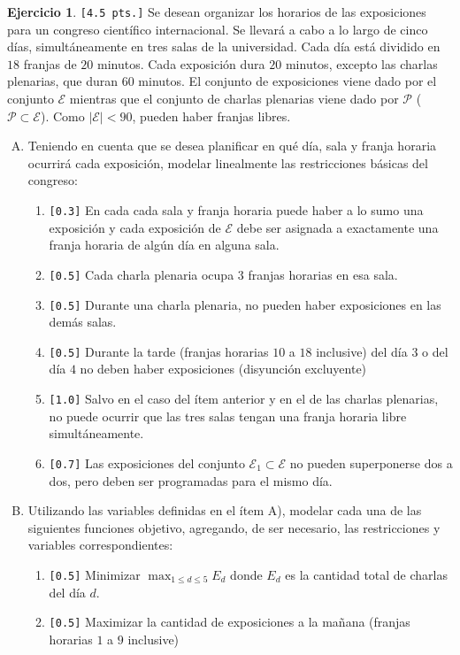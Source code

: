 \documentclass[a4paper,oneside,12pt]{amsart}
\def \ds{\displaystyle}
\theoremstyle{definition}
\newtheorem{quest}{Ejercicio}
\begin{document}


\begin{quest} 

\verb|[4.5 pts.]| Se desean organizar los horarios de las exposiciones para un congreso científico internacional. Se llevará a cabo a lo largo de cinco días, simultáneamente en tres salas de la universidad. Cada día está dividido en $18$ franjas de $20$ minutos. Cada exposición dura $20$ minutos, excepto las charlas plenarias, que duran $60$ minutos. El conjunto de exposiciones viene dado por el conjunto $\mathcal{E}$ mientras que el conjunto de charlas plenarias viene dado por $\mathcal{P}$ ($\mathcal{P}\subset \mathcal{E}$). Como $|\mathcal{E}|<90$, pueden haber franjas libres.
\begin{enumerate}[A)]
   \item Teniendo en cuenta que se desea planificar en qué día, sala y franja horaria ocurrirá cada exposición, modelar linealmente las restricciones básicas del congreso:
   \begin{enumerate}[1.]
        \item \verb|[0.3]| En cada cada sala y franja horaria puede haber a lo sumo una exposición y cada exposición de $\mathcal{E}$ debe ser asignada a exactamente una franja horaria de algún día en alguna sala.
        \item \verb|[0.5]| Cada charla plenaria ocupa $3$ franjas horarias en esa sala.
        \item \verb|[0.5]| Durante una charla plenaria, no pueden haber exposiciones en las demás salas.
        \item \verb|[0.5]| Durante la tarde (franjas horarias $10$ a $18$ inclusive) del día $3$ o del día $4$ no deben haber exposiciones (disyunción excluyente)
        \item \verb|[1.0]| Salvo en el caso del ítem anterior y en el de las charlas plenarias, no puede ocurrir que las tres salas tengan una franja horaria libre simultáneamente.
        \item \verb|[0.7]| Las exposiciones del conjunto $\mathcal{E}_1\subset \mathcal{E}$ no pueden superponerse dos a dos, pero deben ser programadas para el mismo día.
   \end{enumerate}
   \item Utilizando las variables definidas en el ítem A), modelar cada una de las siguientes funciones objetivo, agregando, de ser necesario, las restricciones y variables correspondientes:
    \begin{enumerate}[1.]
        \item \verb|[0.5]| Minimizar $\ds\max_{1\leq d\leq 5} E_d$ donde $E_d$ es la cantidad total de charlas del día $d$.
        \item \verb|[0.5]| Maximizar la cantidad de exposiciones a la mañana (franjas horarias $1$ a $9$ inclusive) 
    \end{enumerate}
\end{enumerate}
\end{quest}
\end{document}
